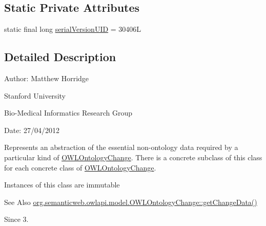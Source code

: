 \subsection*{Static Private Attributes}
\begin{DoxyCompactItemize}
\item 
static final long \hyperlink{classorg_1_1semanticweb_1_1owlapi_1_1change_1_1_o_w_l_ontology_change_data_aa21d0ac73193ff5f768f4302dae0024e}{serial\-Version\-U\-I\-D} = 30406\-L
\end{DoxyCompactItemize}


\subsection{Detailed Description}
Author\-: Matthew Horridge\par
 Stanford University\par
 Bio-\/\-Medical Informatics Research Group\par
 Date\-: 27/04/2012 

Represents an abstraction of the essential non-\/ontology data required by a particular kind of \hyperlink{}{O\-W\-L\-Ontology\-Change}. There is a concrete subclass of this class for each concrete class of \hyperlink{}{O\-W\-L\-Ontology\-Change}. 

Instances of this class are immutable 

\begin{DoxySeeAlso}{See Also}
\hyperlink{classorg_1_1semanticweb_1_1owlapi_1_1model_1_1_o_w_l_ontology_change_a30dca4cf4eeafa199039ac705dc233d6}{org.\-semanticweb.\-owlapi.\-model.\-O\-W\-L\-Ontology\-Change\-::get\-Change\-Data()} 
\end{DoxySeeAlso}
\begin{DoxySince}{Since}
3. 
\end{DoxySince}


